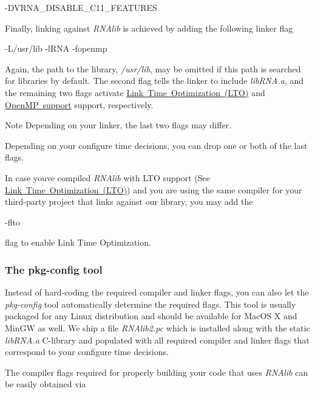 \begin{DoxyVerb}-DVRNA_DISABLE_C11_FEATURES
\end{DoxyVerb}


Finally, linking against {\itshape R\+N\+Alib} is achieved by adding the following linker flag

\begin{DoxyVerb}-L/usr/lib -lRNA -fopenmp
\end{DoxyVerb}


Again, the path to the library, {\itshape /usr/lib}, may be omitted if this path is searched for libraries by default. The second flag tells the linker to include {\itshape lib\+R\+N\+A.\+a}, and the remaining two flags activate \mbox{\hyperlink{install_config_lto}{Link Time Optimization (L\+TO)}} and \mbox{\hyperlink{install_config_openmp}{Open\+MP support}} support, respectively. \begin{DoxyNote}{Note}
Depending on your linker, the last two flags may differ. 

Depending on your configure time decisions, you can drop one or both of the last flags. 

In case you\textquotesingle{}ve compiled {\itshape R\+N\+Alib} with L\+TO support (See \mbox{\hyperlink{install_config_lto}{Link Time Optimization (L\+TO)}}) and you are using the same compiler for your third-\/party project that links against our library, you may add the
\begin{DoxyCode}
-flto 
\end{DoxyCode}
 flag to enable Link Time Optimization.
\end{DoxyNote}
\hypertarget{install_linking_pkgconfig}{}\subsubsection{The pkg-\/config tool}\label{install_linking_pkgconfig}
Instead of hard-\/coding the required compiler and linker flags, you can also let the {\itshape pkg-\/config} tool automatically determine the required flags. This tool is usually packaged for any Linux distribution and should be available for Mac\+OS X and Min\+GW as well. We ship a file {\itshape R\+N\+Alib2.\+pc} which is installed along with the static {\itshape lib\+R\+N\+A.\+a} C-\/library and populated with all required compiler and linker flags that correspond to your configure time decisions.

The compiler flags required for properly building your code that uses {\itshape R\+N\+Alib} can be easily obtained via

